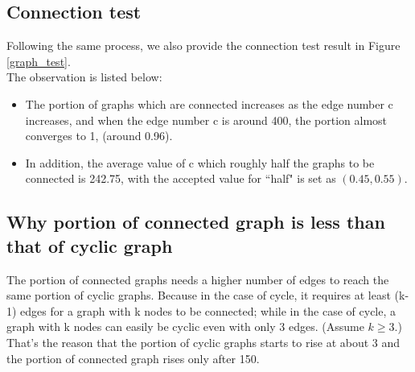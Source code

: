 \documentclass[12pt]{article}
\begin{document}
\subsection{Connection test}
Following the same process, we also provide the connection test result in Figure \ref{graph_test}.\\

\noindent
The observation is listed below: 
\begin{itemize}
\item The portion of graphs which are connected increases as the edge number c increases, and when the edge number c is around 400, the portion almost converges to 1, (around 0.96). 
\item In addition, the average value of c which roughly half the graphs to be connected is 242.75, with the accepted value for ``half" is set as $(0.45, 0.55)$. 
\end{itemize}

\subsection{Why portion of connected graph is less than that of cyclic graph}
The portion of connected graphs needs a higher number of edges to reach the same portion of cyclic graphs. Because in the case of cycle, it requires at least (k-1) edges for a graph with k nodes to be connected; while in the case of cycle, a graph with k nodes can easily be cyclic even with only 3 edges. (Assume $k \geq 3$.) That's the reason that the portion of cyclic graphs starts to rise at about 3 and the portion of connected graph rises only after 150.




\newpage
\end{document}
